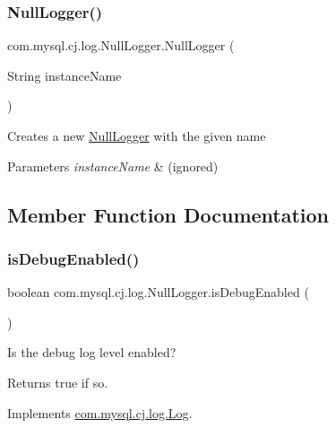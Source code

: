\subsubsection{\texorpdfstring{Null\+Logger()}{NullLogger()}}
{\footnotesize\ttfamily com.\+mysql.\+cj.\+log.\+Null\+Logger.\+Null\+Logger (\begin{DoxyParamCaption}\item[{String}]{instance\+Name }\end{DoxyParamCaption})}

Creates a new \mbox{\hyperlink{classcom_1_1mysql_1_1cj_1_1log_1_1_null_logger}{Null\+Logger}} with the given name


\begin{DoxyParams}{Parameters}
{\em instance\+Name} & (ignored) \\
\hline
\end{DoxyParams}


\subsection{Member Function Documentation}
\mbox{\label{classcom_1_1mysql_1_1cj_1_1log_1_1_null_logger_acd9c06dcf57d15d16653d31aca25d885}} 
\subsubsection{\texorpdfstring{is\+Debug\+Enabled()}{isDebugEnabled()}}
{\footnotesize\ttfamily boolean com.\+mysql.\+cj.\+log.\+Null\+Logger.\+is\+Debug\+Enabled (\begin{DoxyParamCaption}{ }\end{DoxyParamCaption})}

Is the \textquotesingle{}debug\textquotesingle{} log level enabled?

\begin{DoxyReturn}{Returns}
true if so. 
\end{DoxyReturn}


Implements \mbox{\hyperlink{interfacecom_1_1mysql_1_1cj_1_1log_1_1_log_a8340f13152932af117ec2f5884c06dd3}{com.\+mysql.\+cj.\+log.\+Log}}.

\mbox{\label{classcom_1_1mysql_1_1cj_1_1log_1_1_null_logger_af10dc1e8e5216c051f786d1d7578bb07}} 
